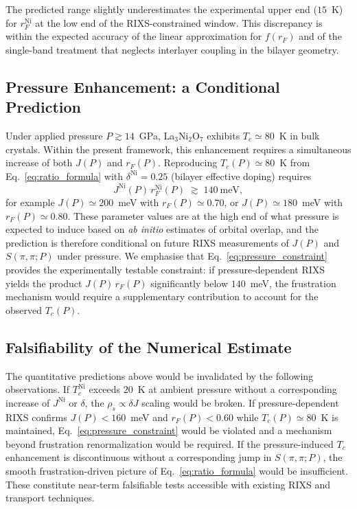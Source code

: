     The predicted range slightly underestimates the experimental upper end ($15$~K) for
    $r_F^\textrm{Ni}$ at the low end of the RIXS-constrained window.
    This discrepancy is within the expected accuracy of the linear approximation for $f(r_F)$
    and of the single-band treatment that neglects interlayer coupling in the bilayer geometry.

  \subsection{Pressure Enhancement: a Conditional Prediction}
    \label{subsec:pressure-enhancement:-a-conditional-prediction}

    Under applied pressure $P \gtrsim 14$~GPa, La$_3$Ni$_2$O$_7$ exhibits
    $T_c \simeq 80$~K in bulk crystals.
    Within the present framework, this enhancement requires a simultaneous increase of both $J(P)$
    and $r_F(P)$.
    Reproducing $T_c(P) \simeq 80$~K from Eq.~\eqref{eq:ratio_formula} with
    $\delta^\textrm{Ni} = 0.25$ (bilayer effective doping) requires
    \begin{equation}
      J^\textrm{Ni}(P)\,r_F^\textrm{Ni}(P) \;\gtrsim\; 140~\textrm{meV},
      \label{eq:pressure_constraint}
    \end{equation}
    for example $J(P) \simeq 200$~meV with $r_F(P) \simeq 0.70$, or
    $J(P) \simeq 180$~meV with $r_F(P) \simeq 0.80$.
    These parameter values are at the high end of what pressure is expected to induce based on
    \textit{ab initio} estimates of orbital overlap, and the prediction is therefore conditional on
    future RIXS measurements of $J(P)$ and $S(\pi,\pi;P)$ under pressure.
    We emphasise that Eq.~\eqref{eq:pressure_constraint} provides the experimentally testable
    constraint: if pressure-dependent RIXS yields the product $J(P)\,r_F(P)$ significantly below
    $140$~meV, the frustration mechanism would require a supplementary contribution to account
    for the observed $T_c(P)$.

  \subsection{Falsifiability of the Numerical Estimate}

    The quantitative predictions above would be invalidated by the following observations.
    If $T_c^\textrm{Ni}$ exceeds $20$~K at ambient pressure without a corresponding increase of
    $J^\textrm{Ni}$ or $\delta$, the $\rho_s \propto \delta J$ scaling would be broken.
    If pressure-dependent RIXS confirms $J(P) < 160$~meV and $r_F(P) < 0.60$ while $T_c(P) \simeq 80$~K
    is maintained, Eq.~\eqref{eq:pressure_constraint} would be violated and a mechanism beyond
    frustration renormalization would be required.
    If the pressure-induced $T_c$ enhancement is discontinuous without a corresponding jump in
    $S(\pi,\pi;P)$, the smooth frustration-driven picture of Eq.~\eqref{eq:ratio_formula} would
    be insufficient.
    These constitute near-term falsifiable tests accessible with existing RIXS and transport
    techniques.
